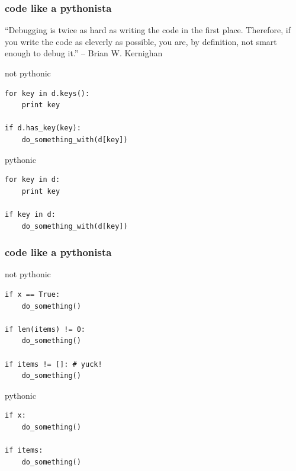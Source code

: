 \documentclass{beamer}
\begin{document}
\begin{frame}[fragile]
	\frametitle{code like a pythonista}
	
	``Debugging is twice as hard as writing the code in the first place. Therefore, if you write the code as cleverly as possible, you are, by definition, not smart enough to debug it.'' -- Brian W. Kernighan
\pause

	\begin{alertblock}{not pythonic}
	\begin{lstlisting}
for key in d.keys():
    print key

if d.has_key(key):
    do_something_with(d[key])
    \end{lstlisting}
	\end{alertblock}
\pause	
	\begin{exampleblock}{pythonic}
	\begin{lstlisting}
for key in d:
    print key

if key in d:
    do_something_with(d[key])
    \end{lstlisting}
	\end{exampleblock}
\end{frame}

\begin{frame}[fragile]
	\frametitle{code like a pythonista}
	
	\begin{alertblock}{not pythonic}
	\begin{lstlisting}
if x == True:
    do_something()

if len(items) != 0:
    do_something()
    
if items != []: # yuck!
    do_something()
    \end{lstlisting}
	\end{alertblock}
\pause
	\begin{exampleblock}{pythonic}
	\begin{lstlisting}
if x:
    do_something()
    
if items:
    do_something()    
    \end{lstlisting}
	\end{exampleblock}
\end{frame}
\end{document}
